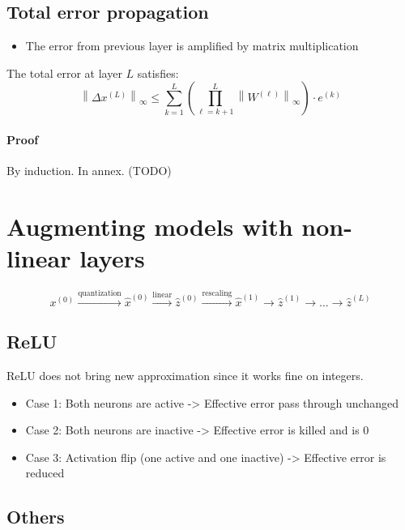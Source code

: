 \documentclass[11pt, a4paper]{article}
\newcommand{\norm}[1]{\left\|#1\right\|}
\begin{document}
\subsection{Total error propagation}

\begin{itemize}
    \item The error from previous layer is amplified by matrix multiplication
\end{itemize}
The total error at layer $L$ satisfies:
\begin{equation}
\boxed{
    \norm{\Delta x^{(L)}}_{\infty} \leq
    \sum_{k=1}^{L}
    \left(\prod_{\ell=k+1}^{L} \norm{W^{(\ell)}}_\infty\right)
    \cdot e^{(k)}
    }
\end{equation}

\paragraph{Proof}
By induction. In annex. (TODO)

\section{Augmenting models with non-linear layers}

$$
x^{(0)}
\xrightarrow{\text{quantization}} \hat{x}^{(0)}
\xrightarrow{\text{linear}} \hat{z}^{(0)}
\xrightarrow{\text{rescaling}} \hat{x}^{(1)} \rightarrow \hat{z}^{(1)} \rightarrow ...
\rightarrow \hat{z}^{(L)}
$$
%
\subsection{ReLU}
ReLU does not bring new approximation since it works fine on integers.
\begin{itemize}
	\item Case 1: Both neurons are active -> Effective error pass through unchanged
	\item Case 2: Both neurons are inactive -> Effective error is killed and is 0
	\item Case 3: Activation flip (one active and one inactive) -> Effective error is reduced
\end{itemize}

\subsection{Others}
\end{document}
